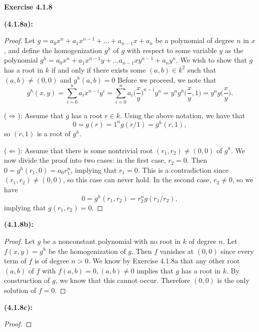\documentclass[12pt,oneside]{article}
\newenvironment{exercise}[1]{\vspace{.1in}\noindent\textbf{Exercise #1 \hspace{.05em}}}{}
\begin{document}

\begin{exercise}{4.1.8}

    \bigskip
    \textbf{(4.1.8a):}
    \begin{proof}
        Let $g = a_0x^n + a_1x^{n-1} + \ldots + a_{n-1}x + a_n$ be a polynomial of degree 
        $n$ in $x$, and define the homogenization $g^h$ of $g$ with respect to some 
        variable $y$ as the polynomial $g^h = a_0x^n +a_1x^{n-1}y + \ldots a_{n-1}xy^{n-1} + a_ny^n$.
        We wish to show that $g$ has a root in $k$ if and only if there exists some 
        $(a,b) \in k^2$ such that $(a,b) \neq (0,0)$ and $g^h(a,b) = 0$ Before we 
        proceed, we note that 
        \[
            g^h(x,y) = \sum_{i=0}^n a_ix^{n-i}y^i = \sum_{i=0}^na_i\biggr(\frac{x}{y}\biggr)^{n-i}y^n = y^ng^h\biggr(\frac{x}{y},1\biggr) = y^ng\biggr(\frac{x}{y}\biggr).
        \]
        
        \bigskip
        ($\Rightarrow$): Assume that $g$ has a root $r \in k$. Using the above notation, 
        we have that 
        \[
            0 = g(r) = 1^ng(r/1) = g^h(r,1),
        \]
        so $(r,1)$ is a root of $g^h$.
        
        \bigskip
        ($\Leftarrow$): Assume that there is some nontrivial root $(r_1,r_2) \neq (0,0)$ 
        of $g^h$. We now divide the proof into two cases: in the first case, $r_2 = 0$. 
        Then $0=g^h(r_1,0) = a_0r_1^n$, implying that $r_1 = 0$. This is a contradiction 
        since $(r_1,r_2) \neq (0,0)$, so this case can never hold. 
        In the second case, $r_2 \neq 0$, so we have 
        \[
            0 = g^h(r_1,r_2) = r_2^ng(r_1/r_2),
        \]
        implying that $g(r_1,r_2) = 0$.
    \end{proof}
    
    \bigskip
    \textbf{(4.1.8b):}
    \begin{proof}
        Let $g$ be a nonconstant polynomial with no root in $k$ of degree $n$. Let 
        $f(x,y) = g^h$ be the homogenization of $g$. Then $f$ vanishes at $(0,0)$ since 
        every term of $f$ is of degree $n > 0$. We know by Exercise 4.1.8a that any other 
        root $(a,b)$ of $f$ with $f(a,b) = 0, (a,b) \neq 0$ implies that $g$ has a root 
        in $k$. By construction of $g$, we know that this cannot occur. Therefore $(0,0)$ 
        is the only solution of $f=0$.
    \end{proof}
    
    \bigskip
    \textbf{(4.1.8c):}
    \begin{proof}
        

\end{proof}
\end{exercise}
\end{document}
